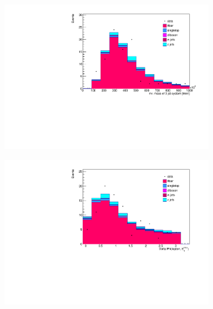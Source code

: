 \begin{figure}[H]
  \begin{subfigure}{0.5\textwidth}
    \centering
    \includegraphics[width=\linewidth]{plots_and_txt/stacked_plots/stacked_3JetSys.pdf}
    \caption{}
    \label{fig:stacked_3jetsys}
  \end{subfigure}%
  \begin{subfigure}{0.5\textwidth}
    \centering
    \includegraphics[width=\linewidth]{plots_and_txt/stacked_plots/stacked_deltaphi.pdf}
    \caption{}
    \label{fig:stacked_deltaphi}
  \end{subfigure}%
  \newline
  \begin{subfigure}{0.5\textwidth}
    \centering

\end{subfigure}
\end{figure}
